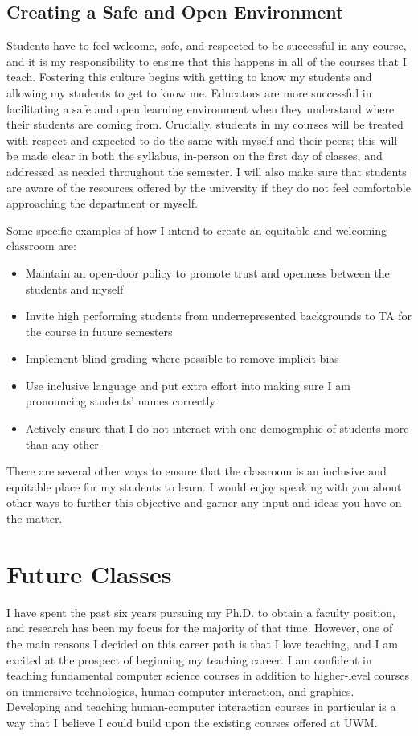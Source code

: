 \subsection*{Creating a Safe and Open Environment}
\vspace{-0.5cm}
Students have to feel welcome, safe, and respected to be successful in any course, and it is my responsibility to ensure that this happens in all of the courses that I teach. Fostering this culture begins with getting to know my students and allowing my students to get to know me. Educators are more successful in facilitating a safe and open learning environment when they understand where their students are coming from. Crucially, students in my courses will be treated with respect and expected to do the same with myself and their peers; this will be made clear in both the syllabus, in-person on the first day of classes, and addressed as needed throughout the semester. I will also make sure that students are aware of the resources offered by the university if they do not feel comfortable approaching the department or myself.

Some specific examples of how I intend to create an equitable and welcoming classroom are: 
\begin{itemize}
    \item Maintain an open-door policy to promote trust and openness between the students and myself
    \item Invite high performing students from underrepresented backgrounds to TA for the course in future semesters
    \item Implement blind grading where possible to remove implicit bias
    \item Use inclusive language and put extra effort into making sure I am pronouncing students' names correctly
    \item Actively ensure that I do not interact with one demographic of students more than any other
\end{itemize}

There are several other ways to ensure that the classroom is an inclusive and equitable place for my students to learn. I would enjoy speaking with you about other ways to further this objective and garner any input and ideas you have on the matter.

\section*{Future Classes}
\vspace{-0.5cm}
I have spent the past six years pursuing my Ph.D. to obtain a faculty position, and research has been my focus for the majority of that time. However, one of the main reasons I decided on this career path is that I love teaching, and I am excited at the prospect of beginning my teaching career. I am confident in teaching fundamental computer science courses in addition to higher-level courses on immersive technologies, human-computer interaction, and graphics. Developing and teaching human-computer interaction courses in particular is a way that I believe I could build upon the existing courses offered at UWM.

